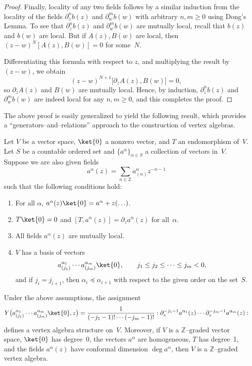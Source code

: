 \documentclass[12pt]{article}
\begin{document}
\begin{proof}
    Finally, locality of any two fields follows by a similar induction from the locality
    of the fields $\partial_z^n b(z)$ and $\partial_w^m b(w)$ with arbitrary $n,m\ge0$
    using Dong’s Lemma.
    To see that $\partial_z^n b(z)$ and $\partial_w^m b(w)$ are mutually local,
    recall that $b(z)$ and $b(w)$ are local.
    But if $A(z),B(w)$ are local, then $(z-w)^N [A(z),B(w)]=0$ for some~$N$.

    Differentiating this formula with respect to $z$, and multiplying the result by $(z-w)$,
    we obtain
    \[
        (z-w)^{N+1}\big[\partial_z A(z),B(w)\big]=0,
    \]
    so $\partial_z A(z)$ and $B(w)$ are mutually local.
    Hence, by induction, $\partial_z^n b(z)$ and $\partial_w^m b(w)$
    are indeed local for any $n,m\ge0$, and this completes the proof.
\end{proof}

The above proof is easily generalized to yield the following result,
which provides a ``generators–and–relations'' approach to the construction of vertex algebras.

Let $V$ be a vector space, $\ket{0}$ a nonzero vector, and $T$ an endomorphism of~$V$.
Let $S$ be a countable ordered set and $\{a^\alpha\}_{\alpha\in S}$ a collection of vectors in~$V$.
Suppose we are also given fields
\[
    a^\alpha(z) = \sum_{n\in\mathbb{Z}} a^\alpha_{(n)} z^{-n-1}
\]
such that the following conditions hold:
\begin{enumerate}
    \item For all $\alpha$, $a^\alpha(z)\ket{0} = a^\alpha + z(\ldots)$.
    \item $T\ket{0}=0$ and $[T,a^\alpha(z)] = \partial_z a^\alpha(z)$ for all~$\alpha$.
    \item All fields $a^\alpha(z)$ are mutually local.
    \item $V$ has a basis of vectors
          \[
              a^{\alpha_1}_{(j_1)} \cdots a^{\alpha_m}_{(j_m)} \ket{0},
              \qquad
              j_1\le j_2 \le \cdots \le j_m < 0,
          \]
          and if $j_i=j_{i+1}$, then $\alpha_i \preceq \alpha_{i+1}$
          with respect to the given order on the set~$S$.
\end{enumerate}

\begin{theorem}
    Under the above assumptions, the assignment
    \begin{equation}\label{2.3.8}
        Y\big(a^{\alpha_1}_{(j_1)}\cdots a^{\alpha_m}_{(j_m)}\ket{0},z\big)
        =\frac{1}{(-j_1-1)!\cdots(-j_m-1)!}
        :\partial_z^{-j_1-1} a^{\alpha_1}(z)\cdots \partial_z^{-j_m-1} a^{\alpha_m}(z):
    \end{equation}
    defines a vertex algebra structure on~$V$.
    Moreover, if $V$ is a $\mathbb{Z}$–graded vector space,
    $\ket{0}$ has degree~0, the vectors $a^\alpha$ are homogeneous,
    $T$ has degree~1, and the fields $a^\alpha(z)$ have conformal dimension
    $\deg a^\alpha$, then $V$ is a $\mathbb{Z}$–graded vertex algebra.
\end{theorem}
\end{document}
